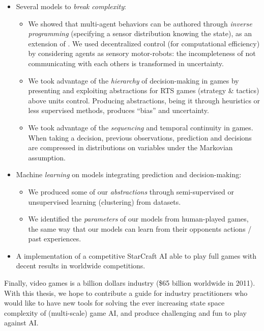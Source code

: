 \begin{itemize}
    \item Several models to \textit{break complexity}:
    \begin{itemize}
        \item We showed that multi-agent behaviors can be authored through \textit{inverse programming} (specifying a sensor distribution knowing the state), as an extension of \citep{theseRonan}. We used decentralized control (for computational efficiency) by considering agents as sensory motor-robots: the incompleteness of not communicating with each others is transformed in uncertainty.
        \item We took advantage of the \textit{hierarchy} of decision-making in games by presenting and exploiting abstractions for RTS games (strategy \& tactics) above units control. Producing abstractions, being it through heuristics or less supervised methods, produces ``bias'' and uncertainty.
        \item We took advantage of the \textit{sequencing} and temporal continuity in games. When taking a decision, previous observations, prediction and decisions are compressed in distributions on variables under the Markovian assumption. %
    \end{itemize}

    \item Machine \textit{learning} on models integrating prediction and decision-making:
    \begin{itemize}
        \item We produced some of our \textit{abstractions} through semi-supervised or unsupervised learning (clustering) from datasets.
        \item We identified the \textit{parameters} of our models from human-played games, the same way that our models can learn from their opponents actions / past experiences.
    \end{itemize}
    \item A implementation of a competitive StarCraft AI able to play full games with decent results in worldwide competitions.

\end{itemize}

Finally, video games is a billion dollars industry (\$65 billion worldwide in 2011). With this thesis, we hope to contribute a guide for industry practitioners who would like to have new tools for solving the ever increasing state space complexity of (multi-scale) game AI, and produce challenging and fun to play against AI. %

